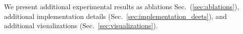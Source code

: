 \clearpage
\setcounter{page}{1}
\maketitlesupplementary
\appendix


%     

We present additional experimental results as ablations Sec.\ (\ref{sec:ablations}), additional implementation details (Sec.\ \ref{sec:implementation_deets}), and additional visualizations (Sec.\ \ref{sec:visualizations}).

